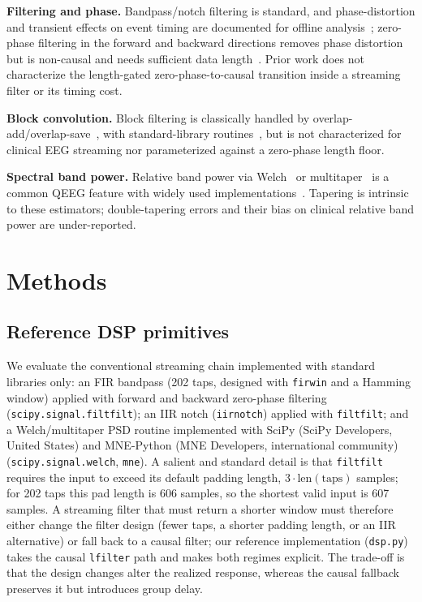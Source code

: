 \documentclass[conference]{IEEEtranSPMB}
\begin{document}
\textbf{Filtering and phase.} Bandpass/notch filtering is standard, and phase-distortion and
transient effects on event timing are documented for offline
analysis~\cite{widmann2015,decheveigne2019}; zero-phase filtering in the forward and backward
directions removes phase
distortion but is non-causal and needs sufficient data length~\cite{oppenheim2009}. Prior work
does not characterize the length-gated zero-phase-to-causal transition inside a streaming filter
or its timing cost.

\textbf{Block convolution.} Block filtering is classically handled by
overlap-add/overlap-save~\cite{oppenheim2009,proakis2007}, with standard-library
routines~\cite{virtanen2020}, but is not characterized for clinical EEG streaming nor parameterized
against a zero-phase length floor.

\textbf{Spectral band power.} Relative band power via Welch~\cite{welch1967} or
multitaper~\cite{thomson1982} is a common QEEG feature with widely used
implementations~\cite{gramfort2013,virtanen2020}. Tapering is intrinsic to these estimators;
double-tapering errors and their bias on clinical relative band power are under-reported.

\section{Methods}
\subsection{Reference DSP primitives}
We evaluate the conventional streaming chain implemented with standard libraries only: an FIR
bandpass (202 taps, designed with \texttt{firwin} and a Hamming window) applied with
forward and backward zero-phase filtering (\texttt{scipy.signal.filtfilt}); an IIR notch
(\texttt{iirnotch}) applied with \texttt{filtfilt}; and a Welch/multitaper PSD routine implemented
with SciPy (SciPy Developers, United States) and MNE-Python (MNE Developers, international community)
(\texttt{scipy.signal.welch}, \texttt{mne}). A salient and standard detail is that
\texttt{filtfilt} requires the input to exceed its default padding length,
$3\!\cdot\!\mathrm{len(taps)}$ samples; for 202 taps this pad length is 606 samples, so the
shortest valid input is 607 samples. A streaming filter that must return a shorter window must
therefore either change the filter design (fewer taps, a shorter padding length, or an IIR
alternative) or fall back to a causal filter; our reference implementation (\texttt{dsp.py}) takes
the causal \texttt{lfilter} path and makes both regimes explicit. The trade-off is that the design
changes alter the realized response, whereas the causal fallback preserves it but introduces group
delay.
\end{document}
